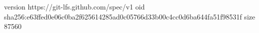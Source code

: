version https://git-lfs.github.com/spec/v1
oid sha256:e63ffed0e06c0ba2f625614285ad0c05766d33b00c4cc0d6ba644fa51f98531f
size 87560
